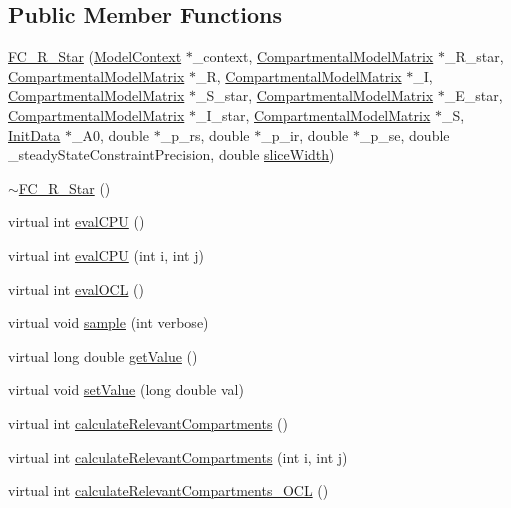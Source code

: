 \subsection*{Public Member Functions}
\begin{DoxyCompactItemize}
\item 
\hyperlink{classSpatialSEIR_1_1FC__R__Star_a487165b3f1aaac332232d06c14104c3d}{F\-C\-\_\-\-R\-\_\-\-Star} (\hyperlink{classSpatialSEIR_1_1ModelContext}{Model\-Context} $\ast$\-\_\-context, \hyperlink{classSpatialSEIR_1_1CompartmentalModelMatrix}{Compartmental\-Model\-Matrix} $\ast$\-\_\-\-R\-\_\-star, \hyperlink{classSpatialSEIR_1_1CompartmentalModelMatrix}{Compartmental\-Model\-Matrix} $\ast$\-\_\-\-R, \hyperlink{classSpatialSEIR_1_1CompartmentalModelMatrix}{Compartmental\-Model\-Matrix} $\ast$\-\_\-\-I, \hyperlink{classSpatialSEIR_1_1CompartmentalModelMatrix}{Compartmental\-Model\-Matrix} $\ast$\-\_\-\-S\-\_\-star, \hyperlink{classSpatialSEIR_1_1CompartmentalModelMatrix}{Compartmental\-Model\-Matrix} $\ast$\-\_\-\-E\-\_\-star, \hyperlink{classSpatialSEIR_1_1CompartmentalModelMatrix}{Compartmental\-Model\-Matrix} $\ast$\-\_\-\-I\-\_\-star, \hyperlink{classSpatialSEIR_1_1CompartmentalModelMatrix}{Compartmental\-Model\-Matrix} $\ast$\-\_\-\-S, \hyperlink{classSpatialSEIR_1_1InitData}{Init\-Data} $\ast$\-\_\-\-A0, double $\ast$\-\_\-p\-\_\-rs, double $\ast$\-\_\-p\-\_\-ir, double $\ast$\-\_\-p\-\_\-se, double \-\_\-steady\-State\-Constraint\-Precision, double \hyperlink{classSpatialSEIR_1_1FullConditional_a150ee031af8d086ad0a04b13630a110f}{slice\-Width})
\item 
\hyperlink{classSpatialSEIR_1_1FC__R__Star_afaac9a9b5d6fded7517b37689cedf8ed}{$\sim$\-F\-C\-\_\-\-R\-\_\-\-Star} ()
\item 
virtual int \hyperlink{classSpatialSEIR_1_1FC__R__Star_a09995dd094fbcc1ee4a02d55e56f8dd6}{eval\-C\-P\-U} ()
\item 
virtual int \hyperlink{classSpatialSEIR_1_1FC__R__Star_aa18118eca9c6fe08ba45449d15a05c64}{eval\-C\-P\-U} (int i, int j)
\item 
virtual int \hyperlink{classSpatialSEIR_1_1FC__R__Star_af019ed60b853ab3ec89b008d0ae566c0}{eval\-O\-C\-L} ()
\item 
virtual void \hyperlink{classSpatialSEIR_1_1FC__R__Star_a18c2097b9333619d95f3e40fbbe070ba}{sample} (int verbose)
\item 
virtual long double \hyperlink{classSpatialSEIR_1_1FC__R__Star_a538786683fedde6a14c85b9081de3c4a}{get\-Value} ()
\item 
virtual void \hyperlink{classSpatialSEIR_1_1FC__R__Star_a751a02d582eae457a5ce86edee57401c}{set\-Value} (long double val)
\item 
virtual int \hyperlink{classSpatialSEIR_1_1FC__R__Star_a530cd0998d1c4c7f2cefe403cedcaf07}{calculate\-Relevant\-Compartments} ()
\item 
virtual int \hyperlink{classSpatialSEIR_1_1FC__R__Star_a3bc76c6c1f22fe238f385ccb3f032e26}{calculate\-Relevant\-Compartments} (int i, int j)
\item 
virtual int \hyperlink{classSpatialSEIR_1_1FC__R__Star_a8e3f3e5cab00e89a2e4fdb21d7460fd4}{calculate\-Relevant\-Compartments\-\_\-\-O\-C\-L} ()
\end{DoxyCompactItemize}
